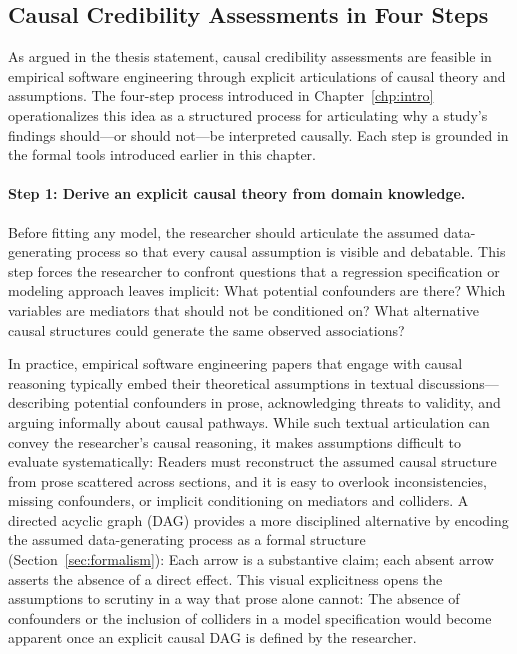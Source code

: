 \subsection{Causal Credibility Assessments in Four Steps}

As argued in the thesis statement, causal credibility assessments are feasible in empirical software engineering through explicit articulations of causal theory and assumptions.
The four-step process introduced in Chapter~\ref{chp:intro} operationalizes this idea as a structured process for articulating why a study's findings should---or should not---be interpreted causally.
Each step is grounded in the formal tools introduced earlier in this chapter.

\paragraph{Step 1: Derive an explicit causal theory from domain knowledge.}
Before fitting any model, the researcher should articulate the assumed data-generating process so that every causal assumption is visible and debatable.
This step forces the researcher to confront questions that a regression specification or modeling approach leaves implicit: What potential confounders are there?
Which variables are mediators that should not be conditioned on?
What alternative causal structures could generate the same observed associations?

In practice, empirical software engineering papers that engage with causal reasoning typically embed their theoretical assumptions in textual discussions---describing potential confounders in prose, acknowledging threats to validity, and arguing informally about causal pathways.
While such textual articulation can convey the researcher's causal reasoning, it makes assumptions difficult to evaluate systematically: Readers must reconstruct the assumed causal structure from prose scattered across sections, and it is easy to overlook inconsistencies, missing confounders, or implicit conditioning on mediators and colliders.
A directed acyclic graph (DAG) provides a more disciplined alternative by encoding the assumed data-generating process as a formal structure (Section~\ref{sec:formalism}): Each arrow is a substantive claim; each absent arrow asserts the absence of a direct effect.
This visual explicitness opens the assumptions to scrutiny in a way that prose alone cannot: The absence of confounders or the inclusion of colliders in a model specification would become apparent once an explicit causal DAG is defined by the researcher.

